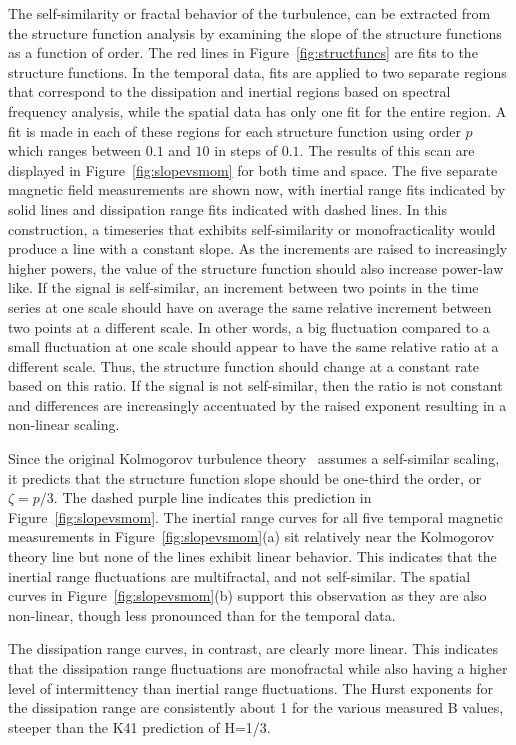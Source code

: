 \documentclass[preprint2]{aastex}
\begin{document}
The self-similarity or fractal behavior of the turbulence, can be extracted from the structure function analysis by examining the slope of the structure functions as a function of order. The red lines in Figure~\ref{fig:structfuncs} are fits to the structure functions. In the temporal data, fits are applied to two separate regions that correspond to the dissipation and inertial regions based on spectral frequency analysis, while the spatial data has only one fit for the entire region. A fit is made in each of these regions for each structure function using order $p$ which ranges between $0.1$ and $10$ in steps of $0.1$. The results of this scan are displayed in Figure~\ref{fig:slopevsmom} for both time and space. The five separate magnetic field measurements are shown now, with inertial range fits indicated by solid lines and dissipation range fits indicated with dashed lines. In this construction, a timeseries that exhibits self-similarity or monofracticality would produce a line with a constant slope. As the increments are raised to increasingly higher powers, the value of the structure function should also increase power-law like. If the signal is self-similar, an increment between two points in the time series at one scale should have on average the same relative increment between two points at a different scale. In other words, a big fluctuation compared to a small fluctuation at one scale should appear to have the same relative ratio at a different scale. Thus, the structure function should change at a constant rate based on this ratio. If the signal is not self-similar, then the ratio is not constant and differences are increasingly accentuated by the raised exponent resulting in a non-linear scaling.

Since the original Kolmogorov turbulence theory~\citep{kolmogorov1941} assumes a self-similar scaling, it predicts that the structure function slope should be one-third the order, or $\zeta = p/3$. The dashed purple line indicates this prediction in Figure~\ref{fig:slopevsmom}. The inertial range curves for all five temporal magnetic measurements in Figure~\ref{fig:slopevsmom}(a) sit relatively near the Kolmogorov theory line but none of the lines exhibit linear behavior. This indicates that the inertial range fluctuations are multifractal, and not self-similar. The spatial curves in Figure~\ref{fig:slopevsmom}(b) support this observation as they are also non-linear, though less pronounced than for the temporal data.

The dissipation range curves, in contrast, are clearly more linear. This indicates that the dissipation range fluctuations are monofractal while also having a higher level of intermittency than inertial range fluctuations. The Hurst exponents for the dissipation range are consistently about 1 for the various measured B values, steeper than the K41 prediction of H=1/3.
\end{document}
